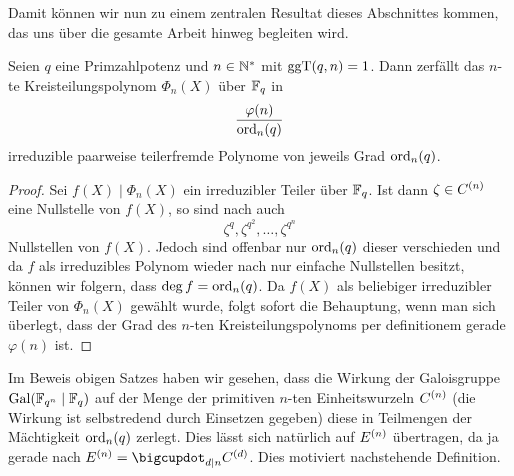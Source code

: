 Damit können wir nun zu einem zentralen Resultat dieses Abschnittes kommen, das
uns über die gesamte Arbeit hinweg begleiten wird.

\begin{satz}
  \label{satz:zerfall_kreisteilungspolys}
  Seien $q$ eine Primzahlpotenz und $n\in \mathbb{N}^\ast$ mit $\operatorname{ggT}(q,n)=1$. Dann
  zerfällt das $n$-te Kreisteilungspolynom $\Phi_n(X)$ über $\mathbb{F}_q$ in
  \[ \frac{\varphi(n)}{\operatorname{ord}_n(q)}\]
  irreduzible paarweise teilerfremde Polynome von jeweils Grad $\operatorname{ord}_n(q)$.
\end{satz}
\begin{proof}
  Sei $f(X) \mid \Phi_n(X)$ ein irreduzibler Teiler über $\mathbb{F}_q$. Ist dann
  $\zeta \in C^{(n)}$ eine Nullstelle von $f(X)$, so sind 
  nach  auch
  \[ \zeta^q, \zeta^{q^2}, \ldots, \zeta^{q^n} \]
  Nullstellen von $f(X)$. Jedoch sind offenbar nur $\operatorname{ord}_n(q)$ dieser 
  verschieden und da $f$ als irreduzibles Polynom wieder nach 
   nur einfache Nullstellen besitzt,
  können wir folgern, dass $\deg f = \operatorname{ord}_n(q)$.
  Da $f(X)$ als beliebiger irreduzibler Teiler von $\Phi_n(X)$ gewählt wurde,
  folgt sofort die Behauptung, wenn man sich überlegt, dass der Grad des
  $n$-ten Kreisteilungspolynoms per definitionem gerade $\varphi(n)$ ist.
\end{proof}


Im Beweis obigen Satzes haben wir gesehen, dass die Wirkung der Galoisgruppe
$\operatorname{Gal}(\mathbb{F}_{q^n}\mid \mathbb{F}_q)$ auf der Menge der primitiven $n$-ten Einheitswurzeln
$C^{(n)}$ (die Wirkung ist selbstredend durch Einsetzen gegeben) diese in 
Teilmengen der Mächtigkeit $\operatorname{ord}_n(q)$ zerlegt.
Dies lässt sich natürlich auf $E^{(n)}$ übertragen, da ja gerade 
nach 
$E\kl n = \bigcupdot_{d\mid n} C\kl d$. 
Dies motiviert nachstehende Definition.


  

